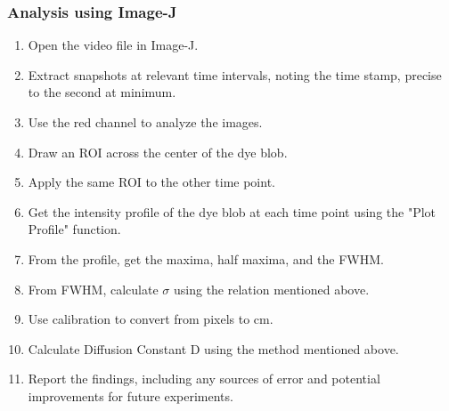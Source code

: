 \documentclass[openany]{book}
\begin{document}
\subsubsection{Analysis using Image-J}
\begin{enumerate}
    \item Open the video file in Image-J.
    \item Extract snapshots at relevant time intervals, noting the time stamp, precise to the second at minimum.
    \item Use the red channel to analyze the images. 
    \item Draw an ROI across the center of the dye blob.
    \item Apply the same ROI to the other time point. 
    \item Get the intensity profile of the dye blob at each time point using the "Plot Profile" function.
    \item From the profile, get the maxima, half maxima, and the FWHM.
    \item From FWHM, calculate $\sigma$ using the relation mentioned above.
    \item Use calibration to convert from pixels to cm.
    \item Calculate Diffusion Constant D using the method mentioned above.
    \item Report the findings, including any sources of error and potential improvements for future experiments.
\end{enumerate}
\end{document}
